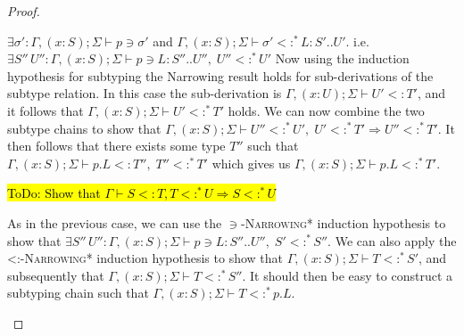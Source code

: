 \documentclass{llncs}
\numberwithin{subcase}{casethm}
\numberwithin{casethm}{theorem}
\numberwithin{casethm}{lemma}
\begin{document}
\begin{proof}
\begin{casethm}
$\exists \sigma':
\Gamma, (x : S); \Sigma \vdash p \ni \sigma'$ and
$\Gamma, (x : S); \Sigma \vdash \sigma' <:^* L : S' .. U'$.
i.e. $\exists S'' \, U'' : \Gamma, (x : S); \Sigma \vdash p \ni L : S'' .. U'', \;
U'' <:^* U'$
Now using the induction hypothesis for subtyping the Narrowing result holds for 
sub-derivations of the subtype relation. In this case the sub-derivation is 
$\Gamma, (x : U); \Sigma \vdash U' <: T'$, and it follows that 
$\Gamma, (x : S); \Sigma \vdash U' <:^* T'$ holds. 
We can now combine the two subtype chains to show that 
$\Gamma, (x : S); \Sigma \vdash U'' <:^* U', \; U' <:^* T' \Rightarrow  U'' <:^* T'$. 
It then follows that there exists some type $T''$ such that 
$\Gamma, (x : S); \Sigma \vdash p.L <: T'', \; T'' <:^* T'$ 
which gives us $\Gamma, (x : S); \Sigma \vdash p.L <:^* T'$.

\hl{ToDo: Show that $\Gamma \vdash S <: T, T <:^* U \Rightarrow S <:^* U$}
\end{casethm}
\begin{casethm}
As in the previous case, we can use the \textsc {$\ni$-Narrowing*}
induction hypothesis to show that 
$\exists S'' \, U'' : \Gamma, (x : S); \Sigma \vdash p \ni L : S'' .. U'', \;
S' <:^* S''$.
We can also apply the \textsc {<:-Narrowing*} induction hypothesis 
to show that $\Gamma, (x : S); \Sigma \vdash T <:^* S'$, 
and subsequently that 
$\Gamma, (x : S); \Sigma \vdash T <:^* S''$. It  should then be easy 
to construct a subtyping chain such that 
$\Gamma, (x : S); \Sigma \vdash T <:^* p.L$.


\end{casethm}
\end{proof}
\end{document}
